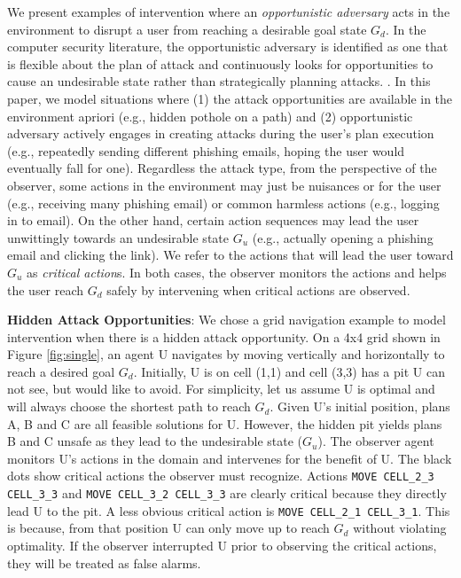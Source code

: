 

We present examples of intervention where an \textit{opportunistic adversary} acts in the environment to disrupt a user from reaching a desirable goal state $G_d$. In the computer security literature, the opportunistic adversary is identified as one that is flexible about the plan of attack and continuously looks for opportunities to cause an undesirable state rather than strategically planning attacks. \cite{Zhang2014opportunistic}. 
In this paper, we model situations where (1) the attack opportunities are available in the environment apriori (e.g., hidden pothole on a path) and (2) opportunistic adversary actively engages in creating attacks during the user's plan execution (e.g., repeatedly sending different phishing emails, hoping the user would eventually fall for one). Regardless the attack type, from the perspective of the observer, some actions in the environment may just be nuisances or for the user (e.g., receiving many phishing email) or common harmless actions (e.g., logging in to email). On the other hand, certain action sequences may lead the user unwittingly towards an undesirable state $G_u$ (e.g., actually opening a phishing email and clicking the link).  We refer to the actions that will lead the user toward $G_u$ as \textit{critical action}s. In both cases, the observer monitors the actions and helps the user reach $G_d$ safely by intervening when critical actions are observed. 

\textbf{Hidden Attack Opportunities}: We chose a grid navigation example to model intervention when there is a hidden attack opportunity. On a 4x4 grid shown in Figure \ref{fig:single}, an agent U navigates by moving vertically and horizontally to reach a desired goal $G_d$. Initially, U is on cell (1,1) and  cell (3,3) has a pit U can not see, but would like to avoid. For simplicity, let us assume U is optimal and will always choose the shortest path to reach $G_d$. Given U's initial position, plans A, B and C are all feasible solutions for U. However, the hidden pit yields plans B and C unsafe as they lead to the undesirable state ($G_u$). The observer agent monitors U's actions in the domain and intervenes for the benefit of U. The black dots show critical actions the observer must recognize. Actions \texttt{MOVE CELL\_2\_3 CELL\_3\_3} and \texttt{MOVE CELL\_3\_2 CELL\_3\_3} are clearly critical because they directly lead U to the pit. A less obvious critical action is \texttt{MOVE CELL\_2\_1 CELL\_3\_1}. This is because, from that position U can only move up to reach $G_d$ without violating optimality. If the observer interrupted U prior to observing the critical actions, they will be treated as false alarms.

